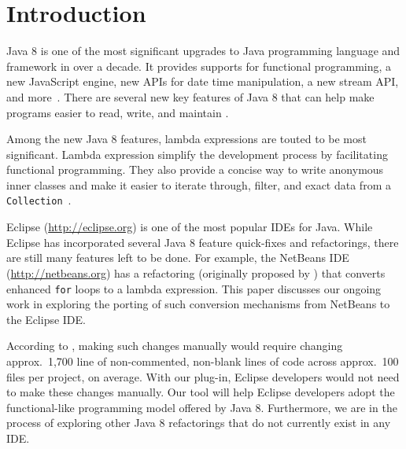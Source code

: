 \section{Introduction}

Java 8 is one of the most significant upgrades to Java programming language
and framework in over a decade. It provides supports for functional
programming, a new JavaScript engine, new APIs for date time manipulation, a
new stream API, and more~\cite{newjdk}. There are several new key features of
Java 8 that can help make programs easier to read, write, and maintain
\cite{gyori2013}.

Among the new Java 8 features, lambda expressions are touted to be most
significant. Lambda expression simplify the development process by
facilitating functional programming. They also provide a concise way to write
anonymous inner classes and make it easier to iterate through, filter, and
exact data from a \lstinline{Collection}~\cite{lambdaqs}.

Eclipse (\url{http://eclipse.org}) is one of the most popular IDEs for
Java. While Eclipse has incorporated several Java 8 feature
quick-fixes
and refactorings, there
are still many features left to be done. For example, the NetBeans
IDE (\url{http://netbeans.org}) has a refactoring (originally proposed
by \citet{gyori2013}) that converts enhanced \lstinline{for} loops to a lambda
expression.  This paper discusses our ongoing work in exploring the porting of
such conversion mechanisms from NetBeans to the Eclipse IDE\@. 

According to \citet{gyori2013}, making such changes manually would require
changing approx.~1,700 line of non-commented, non-blank lines of code across
approx.~100 files per project, on average. With our plug-in, Eclipse
developers would not need to make these changes manually.  Our tool will help
Eclipse developers adopt the functional-like programming model offered by Java
8. Furthermore, we are in the process of exploring other Java 8 refactorings
that do not currently exist in any IDE\@. 
